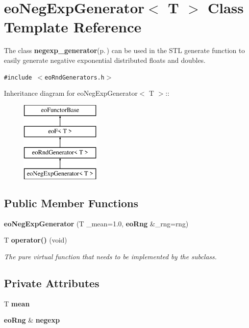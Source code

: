 \section{eo\-Neg\-Exp\-Generator$<$ T $>$ Class Template Reference}
\label{classeo_neg_exp_generator}
The class {\bf negexp\_\-generator}{\rm (p.\,\pageref{classnegexp__generator})} can be used in the STL generate function to easily generate negative exponential distributed floats and doubles.  


{\tt \#include $<$eo\-Rnd\-Generators.h$>$}

Inheritance diagram for eo\-Neg\-Exp\-Generator$<$ T $>$::\begin{figure}[H]
\begin{center}
\leavevmode
\includegraphics[height=4cm]{classeo_neg_exp_generator}
\end{center}
\end{figure}
\subsection*{Public Member Functions}
\begin{CompactItemize}
\item 
{\bf eo\-Neg\-Exp\-Generator} (T \_\-mean=1.0, {\bf eo\-Rng} \&\_\-rng=rng)\label{classeo_neg_exp_generator_a0}

\item 
T {\bf operator()} (void)\label{classeo_neg_exp_generator_a1}

\begin{CompactList}\small\item\em The pure virtual function that needs to be implemented by the subclass. \item\end{CompactList}\end{CompactItemize}
\subsection*{Private Attributes}
\begin{CompactItemize}
\item 
T {\bf mean}\label{classeo_neg_exp_generator_r0}

\item 
{\bf eo\-Rng} \& {\bf negexp}\label{classeo_neg_exp_generator_r1}

\end{CompactItemize}


